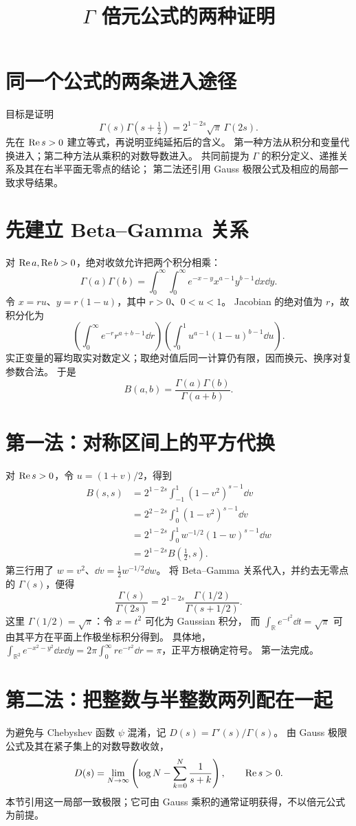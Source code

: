 \documentclass[UTF8,fontset=fandol,11pt]{ctexart}
\title{$\Gamma$ 倍元公式的两种证明}
\begin{document}
\maketitle
\draftnotice
\section{同一个公式的两条进入途径}
目标是证明
\[
 \Gamma(s)\Gamma(s+\tfrac12)=2^{1-2s}\sqrt\pi\,\Gamma(2s).
\]
先在 $\operatorname{Re} s>0$ 建立等式，再说明亚纯延拓后的含义。
第一种方法从积分和变量代换进入；第二种方法从乘积的对数导数进入。
共同前提为 $\Gamma$ 的积分定义、递推关系及其在右半平面无零点的结论；
第二法还引用 Gauss 极限公式及相应的局部一致求导结果。

\section{先建立 Beta--Gamma 关系}
对 $\operatorname{Re} a,\operatorname{Re} b>0$，绝对收敛允许把两个积分相乘：
\[
 \Gamma(a)\Gamma(b)=
 \int_0^\infty\int_0^\infty e^{-x-y}x^{a-1}y^{b-1}\dd x\dd y.
\]
令 $x=ru$、$y=r(1-u)$，其中 $r>0$、$0<u<1$。
Jacobian 的绝对值为 $r$，故积分化为
\[
 \left(\int_0^\infty e^{-r}r^{a+b-1}\dd r\right)
 \left(\int_0^1u^{a-1}(1-u)^{b-1}\dd u\right).
\]
实正变量的幂均取实对数定义；取绝对值后同一计算仍有限，因而换元、换序对复参数合法。
于是
\[
 B(a,b)=\frac{\Gamma(a)\Gamma(b)}{\Gamma(a+b)}.
\]

\section{第一法：对称区间上的平方代换}
对 $\operatorname{Re} s>0$，令 $u=(1+v)/2$，得到
\begin{align*}
 B(s,s)
 &=2^{1-2s}\int_{-1}^1(1-v^2)^{s-1}\dd v\\
 &=2^{2-2s}\int_0^1(1-v^2)^{s-1}\dd v\\
 &=2^{1-2s}\int_0^1w^{-1/2}(1-w)^{s-1}\dd w\\
 &=2^{1-2s}B(\tfrac12,s).
\end{align*}
第三行用了 $w=v^2$、$\dd v=\tfrac12w^{-1/2}\dd w$。
将 Beta--Gamma 关系代入，并约去无零点的 $\Gamma(s)$，便得
\[
 \frac{\Gamma(s)}{\Gamma(2s)}
 =2^{1-2s}\frac{\Gamma(1/2)}{\Gamma(s+1/2)}.
\]
这里 $\Gamma(1/2)=\sqrt\pi$：令 $x=t^2$ 可化为 Gaussian 积分，
而 $\int_{\mathbb R}e^{-t^2}\dd t=\sqrt\pi$ 可由其平方在平面上作极坐标积分得到。
具体地，
$\int_{\mathbb R^2}e^{-x^2-y^2}\dd x\dd y
=2\pi\int_0^\infty re^{-r^2}\dd r=\pi$，正平方根确定符号。
第一法完成。

\section{第二法：把整数与半整数两列配在一起}
为避免与 Chebyshev 函数 $\psi$ 混淆，记
$D(s)=\Gamma'(s)/\Gamma(s)$。
由 Gauss 极限公式及其在紧子集上的对数导数收敛，
\[
 D(s)=\lim_{N\to\infty}
 \left(\log N-\sum_{k=0}^{N}\frac1{s+k}\right),
 \qquad\operatorname{Re} s>0.
\]
本节引用这一局部一致极限；它可由 Gauss 乘积的通常证明获得，不以倍元公式为前提。
\end{document}

